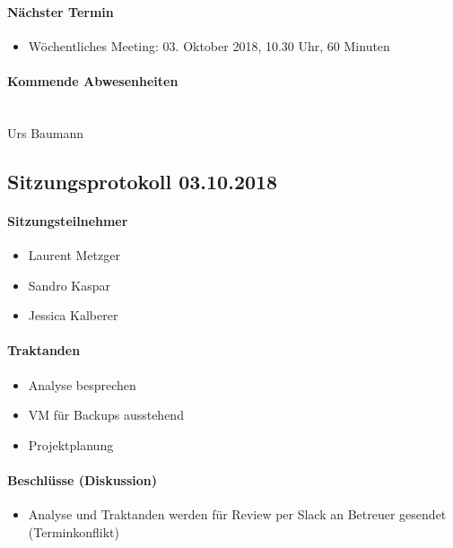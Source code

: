 \paragraph{Nächster Termin}
\begin{itemize}	
	\item Wöchentliches Meeting: 03. Oktober 2018, 10.30 Uhr, 60 Minuten
\end{itemize}

\paragraph{Kommende Abwesenheiten} \mbox{}\\
Urs Baumann

\newpage





\subsection{Sitzungsprotokoll 03.10.2018}

\paragraph{Sitzungsteilnehmer}
\begin{itemize}	
	\item Laurent Metzger 
	\item Sandro Kaspar
	\item Jessica Kalberer
\end{itemize}

\paragraph{Traktanden}
\begin{itemize}	
	\item Analyse besprechen
	\item VM für Backups ausstehend
	\item Projektplanung
\end{itemize}

\paragraph{Beschlüsse (Diskussion)}
\begin{itemize}	
	\item Analyse und Traktanden werden für Review per Slack an Betreuer gesendet (Terminkonflikt)
\end{itemize}


